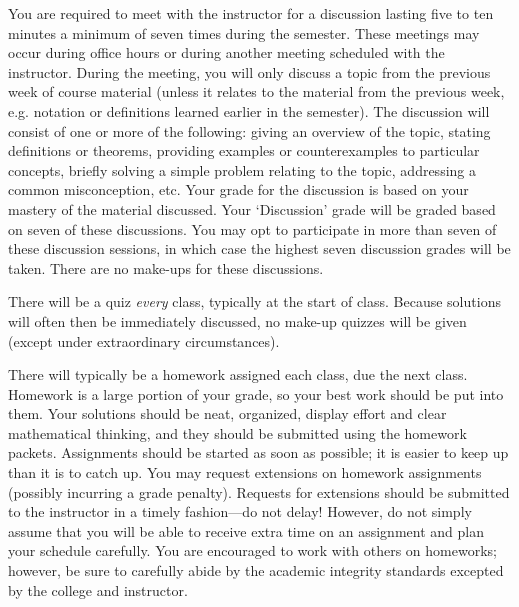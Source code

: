 \documentclass[11pt,letterpaper]{article}
\begin{document}
You are required to meet with the instructor for a discussion lasting five to ten minutes a minimum of seven times during the semester. These meetings may occur during office hours or during another meeting scheduled with the instructor. During the meeting, you will only discuss a topic from the previous week of course material (unless it relates to the material from the previous week, e.g. notation or definitions learned earlier in the semester). The discussion will consist of one or more of the following: giving an overview of the topic, stating definitions or theorems, providing examples or counterexamples to particular concepts, briefly solving a simple problem relating to the topic, addressing a common misconception, etc. Your grade for the discussion is based on your mastery of the material discussed. Your `Discussion' grade will be graded based on seven of these discussions. You may opt to participate in more than seven of these discussion sessions, in which case the highest seven discussion grades will be taken. There are no make-ups for these discussions. 



\newpage



There will be a quiz \textit{every} class, typically at the start of class. Because solutions will often then be immediately discussed, no make-up quizzes will be given (except under extraordinary circumstances). \pspace


There will typically be a homework assigned each class, due the next class. Homework is a large portion of your grade, so your best work should be put into them. Your solutions should be neat, organized, display effort and clear mathematical thinking, and they should be submitted using the homework packets. Assignments should be started as soon as possible; it is easier to keep up than it is to catch up. You may request extensions on homework assignments (possibly incurring a grade penalty). Requests for extensions should be submitted to the instructor in a timely fashion---do not delay! However, do not simply assume that you will be able to receive extra time on an assignment and plan your schedule carefully. You are encouraged to work with others on homeworks; however, be sure to carefully abide by the academic integrity standards excepted by the college and instructor. \pspace
\end{document}
